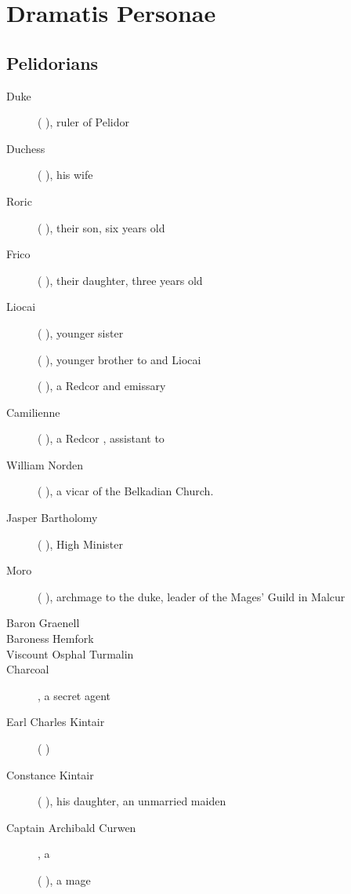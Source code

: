 \section{Dramatis Personae}

\subsection{Pelidorians}
\begin{description}
  \item[Duke \Icor{}] (\scatha{} \male), ruler of Pelidor
	\item[Duchess \Tiroco] (\scatha{} \female), his wife
	\item[Roric] (\scatha{} \male{}), their son, six years old
	\item[Frico] (\scatha{} \female{}), their daughter, three years old
	\item[Liocai] (\scatha{} \female), \Icorz{} younger sister
	\item[\Dornerus] (\scatha{} \male), younger brother to \Icor{} and Liocai
	\item[\Zacophine{} \Vincerre{}] (\human{} \female), a Redcor \mater{} and emissary
	\item[\Clarice{} Camilienne] (\human{} \female), a Redcor \soror, assistant to \Vincerre{}
	\item[William Norden] (\human{} \male{}), a vicar of the Belkadian Church. 
	\item[Jasper Bartholomy] (\scatha{} \male), High Minister
	\item[Moro \Cornell] (\scatha{} \female), archmage to the duke, leader of the Mages' Guild in Malcur
	\item[Baron Graenell]
	\item[Baroness \Rispett{} Hemfork]
	\item[Viscount Osphal Turmalin]
	\item[Charcoal], a secret agent
	\item[Earl Charles Kintair] (\human{} \male{})
	\item[Constance Kintair] (\human{} \female), his daughter, an unmarried maiden
	\item[Captain Archibald Curwen], a \TigerVaimon{}
	\item[\Ambrose{} \Anatoli] (\human{} \male{}), a mage
\end{description}
